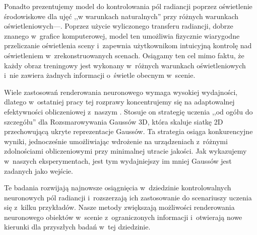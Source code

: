 {  Ponadto prezentujemy model do kontrolowania pól radiancji poprzez oświetlenie
  środowiskowe dla ujęć ,,w warunkach naturalnych'' przy różnych warunkach
  oświetleniowych---\lumigauss.
  Poprzez użycie wyliczonego transferu radiancji, dobrze znanego w~grafice
  komputerowej, model ten umożliwia fizycznie wiarygodne przeliczanie
  oświetlenia sceny i~zapewnia użytkownikom intuicyjną kontrolę nad oświetleniem
  w~zrekonstruowanych scenach.
  Osiągamy ten cel mimo faktu, że każdy obraz treningowy jest wykonany w~różnych
  warunkach oświetleniowych i~nie zawiera żadnych informacji o~świetle obecnym
  w~scenie.

  Wiele zastosowań renderowania neuronowego wymaga wysokiej wydajności, dlatego
  w~ostatniej pracy tej rozprawy koncentrujemy się na adaptowalnej efektywności
  obliczeniowej z~naszym \clog.
  Stosuje on strategię uczenia ,,od ogółu do szczegółu'' dla Rozsmarowywania
  Gaussów 3D, która skaluje siatkę 2D przechowującą ukryte reprezentacje
  Gaussów.
  Ta strategia osiąga konkurencyjne wyniki, jednocześnie umożliwiając wdrożenie
  na urządzeniach z~różnymi zdolnościami obliczeniowymi przy minimalnej utracie
  jakości.
  Jak wykazujemy w~naszych eksperymentach, \clog jest tym wydajniejszy im mniej
  Gaussów jest zadanych jako wejście.

  Te badania rozwijają najnowsze osiągnięcia w~dziedzinie kontrolowalnych
  neuronowych pól radiancji i~rozszerzają ich zastosowanie do scenariuszy
  uczenia się z~kilku przykładów.
  Nasze metody zwiększają możliwości renderowania neuronowego obiektów w~scenie
  z~ograniczonych informacji i~otwierają nowe kierunki dla przyszłych badań
  w~tej dziedzinie.
} %

